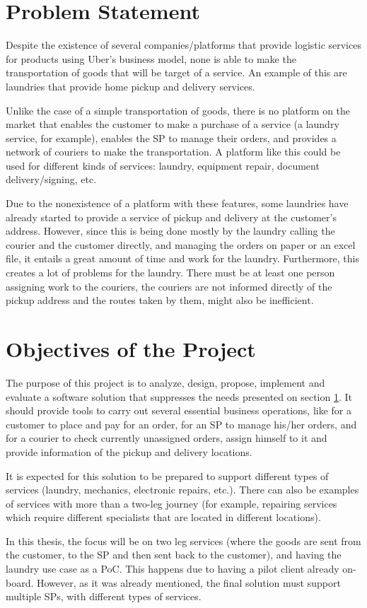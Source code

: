 \section{Problem Statement} 
\label{sec:chap1_problem_statement} 
Despite the existence of several companies/platforms that provide logistic services for products using Uber's business model, none is able to make the transportation of goods that will be target of a service. An example of this are laundries that provide home pickup and delivery services.
\par
Unlike the case of a simple transportation of goods, there is no platform on the market that enables the customer to make a purchase of a service (a laundry service, for example), enables the \gls{SP} to manage their orders, and provides a network of couriers to make the transportation. A platform like this could be used for different kinds of services: laundry, equipment repair, document delivery/signing, etc. 
\par
Due to the nonexistence of a platform with these features, some laundries have already started to provide a service of pickup and delivery at the customer's address. However, since this is being done mostly by the laundry calling the courier and the customer directly, and managing the orders on paper or an excel file, it entails a great amount of time and work for the laundry. Furthermore, this creates a lot of problems for the laundry. There must be at least one person assigning work to the couriers, the couriers are not informed directly of the pickup address and the routes taken by them, might also be inefficient.

\section{Objectives of the Project}
\label{sec:chap1_project_objectives}
The purpose of this project is to analyze, design, propose, implement and evaluate a software solution that suppresses the needs presented on section \ref{sec:chap1_problem_statement}. It should provide tools to carry out several essential business operations, like for a customer to place and pay for an order, for an \gls{SP} to manage his/her orders, and for a courier to check currently unassigned orders, assign himself to it and provide information of the pickup and delivery locations. 
\par 
It is expected for this solution to be prepared to support different types of services (laundry, mechanics, electronic repairs, etc.). There can also be examples of services with more than a two-leg journey (for example, repairing services which require different specialists that are located in different locations).
\par
In this thesis, the focus will be on two leg services (where the goods are sent from the customer, to the \gls{SP} and then sent back to the customer), and having the laundry use case as a \gls{PoC}. This happens due to having a pilot client already on-board. However, as it was already mentioned, the final solution must support multiple \gls{SP}s, with different types of services.


